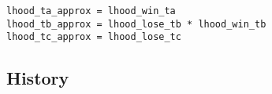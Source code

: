 \documentclass[article]{jss}
\newif\ifen
\newif\ifes
\newcommand{\en}[1]{\ifen#1\fi}
\newcommand{\es}[1]{\ifes#1\fi}
\begin{document}
%
\en{These are the messages sent by the factors $f_{d_1}$ and $f_{d_2}$ to the variables $t_a$ and $t_c$ respectively.}
\es{Estos son los mensajes que envían el factor $f_{d_1}$ y $f_{d_2}$ a la variable $t_a$ y $t_c$ respectivamente.}
%
\en{Finally, we compute the likelihood of each team.}
\es{Finalmente computar los likelihood de cada equipo.}
%
\begin{lstlisting}[backgroundcolor=\color{all},belowskip=0.1cm]
lhood_ta_approx = lhood_win_ta 
lhood_tb_approx = lhood_lose_tb * lhood_win_tb
lhood_tc_approx = lhood_lose_tc
\end{lstlisting}
%

\subsection{History} \label{sec:throguthTime}
\end{document}

